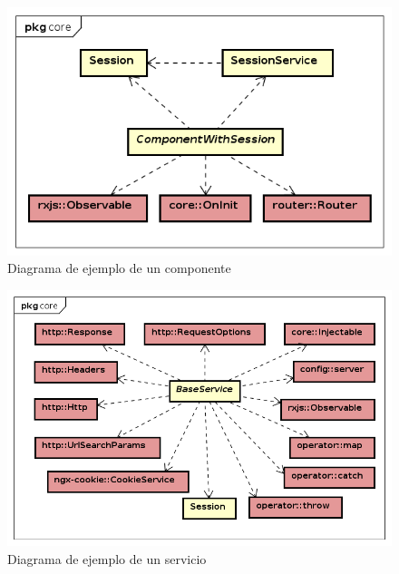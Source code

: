 \documentclass[openright,twoside,10pt]{book}
\begin{document}
    \vspace*{\fill} \newpage
    
    \vspace*{\fill}
    
    \begin{figure}[H]
        \begin{center}
            \includegraphics[width=\textwidth, angle=-90]{img/astah/disenio/descomposicion/front/ejemploComponente.png}
        \end{center}
        \caption{Diagrama de ejemplo de un componente}
    \end{figure}
    
    \vspace*{\fill} \newpage
    
    \vspace*{\fill}
    
    \begin{figure}[H]
        \begin{center}
            \includegraphics[width=\textwidth, angle=-90]{img/astah/disenio/descomposicion/front/ejemploServicio.png}
        \end{center}
        \caption{Diagrama de ejemplo de un servicio}
    \end{figure}
    
\end{document}
